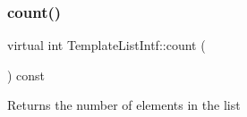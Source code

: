 \mbox{\label{class_template_list_intf_a329e49e33484c2aa5106aac1bf4e5216}} 
\subsubsection{\texorpdfstring{count()}{count()}}
{\footnotesize\ttfamily virtual int Template\+List\+Intf\+::count (\begin{DoxyParamCaption}{ }\end{DoxyParamCaption}) const\hspace{0.3cm}{\ttfamily [pure virtual]}}

Returns the number of elements in the list 

